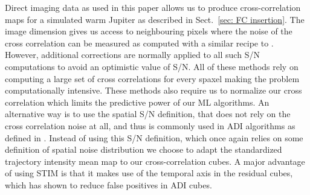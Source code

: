 \documentclass{aa}
\begin{document}
Direct imaging data as used in this paper allows us to produce cross-correlation maps for a simulated warm Jupiter as described in Sect.~\ref{sec: FC insertion}.
The image dimension gives us access to neighbouring pixels where the noise of the cross correlation can be measured as computed with a similar recipe to \citet{2022Patapis}.
However, additional corrections are normally applied to all such S/N computations to avoid an optimistic value of S/N.
All of these methods rely on computing a large set of cross correlations for every spaxel making the problem computationally intensive.
These methods also require us to normalize our cross correlation which limits the predictive power of our ML algorithms.
An alternative way is to use the spatial S/N definition, that does not rely on the cross correlation noise at all, and thus is commonly used in ADI algorithms as defined in \citet{2014MawetSNR}.
Instead of using this S/N definition, which once again relies on some definition of spatial noise distribution we choose to adapt the standardized trajectory intensity mean \citep[STIM,][]{2019Pairet} map to our cross-correlation cubes. 
A major advantage of using STIM is that it makes use of the temporal axis in the residual cubes, which has shown to reduce false positives in ADI cubes.
\end{document}
